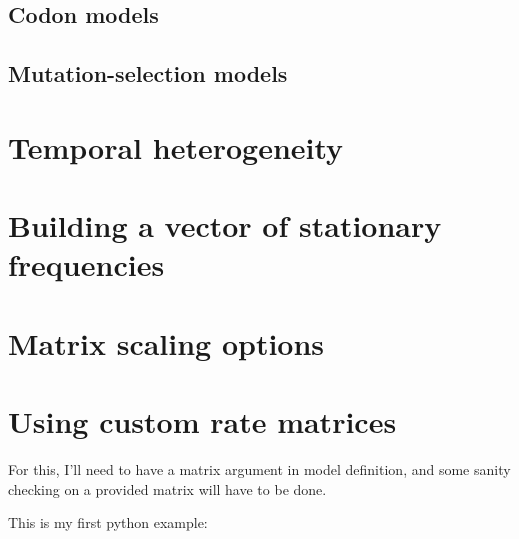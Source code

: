 \documentclass{article}
\newcommand\pythonexternal[2][]{{
		}}
\begin{document}
\subsection{Codon models}
\subsection{Mutation-selection models}
\section{Temporal heterogeneity}
\section{Building a vector of stationary frequencies}\label{sec:freqs}
\section{Matrix scaling options}\label{sec:scaling}
\section{Using custom rate matrices}\label{sec:custom}

For this, I'll need to have a matrix argument in model definition, and some sanity checking on a provided matrix will have to be done.



\noindent This is my first python example:

\pythonexternal{script.py}














\end{document}

